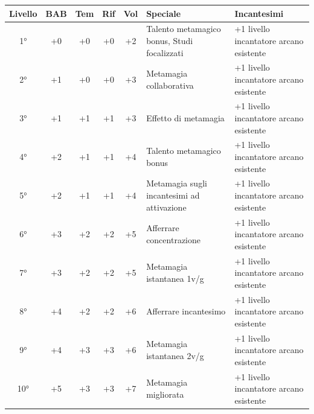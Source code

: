 \documentclass[10pt, a4paper]{report}
\begin{document}
\hspace{-1.6cm}
{\sffamily
\begin{tabular}{|c|c|c|c|c|l|l|}
	\hline
	\textbf{Livello} & \textbf{BAB} & \textbf{Tem} & \textbf{Rif} & \textbf{Vol} & \textbf{Speciale} & \textbf{Incantesimi} \\
	\hline
	1° & +0  & +0  & +0  & +2 & Talento metamagico bonus, Studi focalizzati & +1 livello incantatore arcano esistente \\
	\hline
	2° & +1  & +0  & +0  & +3 & Metamagia collaborativa                       & +1 livello incantatore arcano esistente \\
	\hline
	3° & +1  & +1  & +1  & +3 & Effetto di metamagia                             & +1 livello incantatore arcano esistente \\
	\hline
	4° & +2  & +1  & +1  & +4 & Talento metamagico bonus                        & +1 livello incantatore arcano esistente \\
	\hline
	5° & +2  & +1  & +1  & +4 & Metamagia sugli incantesimi ad attivazione     & +1 livello incantatore arcano esistente \\
	\hline
	6° & +3  & +2  & +2  & +5 & Afferrare concentrazione                          & +1 livello incantatore arcano esistente \\
	\hline
	7° & +3  & +2  & +2  & +5 & Metamagia istantanea 1v/g 						& +1 livello incantatore arcano esistente \\
	\hline
	8° & +4  & +2  & +2  & +6 & Afferrare incantesimo                                 & +1 livello incantatore arcano esistente \\
	\hline
	9° & +4  & +3  & +3  & +6 & Metamagia istantanea 2v/g                      & +1 livello incantatore arcano esistente \\
	\hline
	10° & +5 & +3  & +3  & +7 & Metamagia migliorata     & +1 livello incantatore arcano esistente \\
	\hline
\end{tabular}
}
\end{document}
